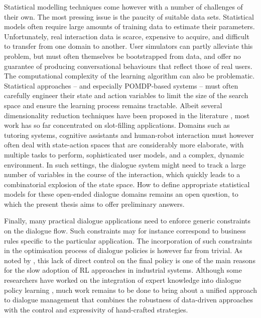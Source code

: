 Statistical modelling techniques come however with a number of challenges of their own. The most pressing issue is the paucity of suitable data sets.  Statistical models often require large amounts of training data to estimate their parameters. Unfortunately, real interaction data is scarce, expensive to acquire, and difficult to transfer from one domain to another.  User simulators can partly alleviate this problem, but must often themselves be bootstrapped from data, and offer no guarantee of producing conversational behaviours that reflect those of real users.  The computational complexity of the learning algorithm can also be problematic. Statistical approaches -- and especially POMDP-based systems -- must often carefully engineer their state and action variables to limit the size of the search space and ensure the learning process remains tractable.  Albeit several dimensionality reduction techniques have been proposed in the literature \citep{williams2005,Young:2010,Cuayahuitl:2010,CrookL11}, most work has so far concentrated on slot-filling applications.   Domains such as tutoring systems, cognitive assistants and human-robot interaction must however often deal with state-action spaces that are considerably more elaborate, with multiple tasks to perform, sophisticated user models, and a complex, dynamic environment.  In such settings, the dialogue system might need to track a large number of variables in the course of the interaction, which quickly leads to a combinatorial explosion of the state space.  How to define appropriate statistical models for these open-ended dialogue domains remains an open question, to which the present thesis aims to offer preliminary answers. 

Finally, many practical dialogue applications need to enforce generic constraints on the dialogue flow.  Such constraints may for instance correspond to business rules specific to the particular application.  The incorporation of such constraints in the optimisation process of dialogue policies is however far from trivial. As noted by \cite{Paek:2008}, this lack of direct control on the final policy is one of the main reasons for the slow adoption of RL approaches in industrial systems.  Although some researchers have worked on the integration of expert knowledge into dialogue policy learning \citep{williams2008,Henderson:2008}, much work remains to be done to bring about a unified approach to dialogue management that combines the robustness of data-driven approaches with the control and expressivity of hand-crafted strategies. 


